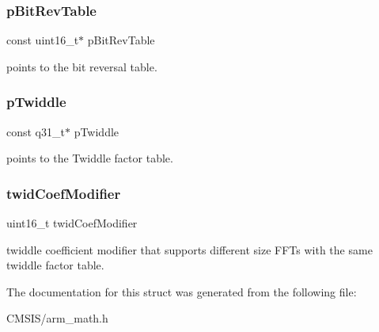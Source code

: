 \subsubsection{\texorpdfstring{pBitRevTable}{pBitRevTable}}
{\footnotesize\ttfamily const uint16\+\_\+t$\ast$ p\+Bit\+Rev\+Table}

points to the bit reversal table. \mbox{\label{structarm__cfft__radix2__instance__q31_a9760c603af5d85652496dbffd63a8a2e}} 
\subsubsection{\texorpdfstring{pTwiddle}{pTwiddle}}
{\footnotesize\ttfamily const q31\+\_\+t$\ast$ p\+Twiddle}

points to the Twiddle factor table. \mbox{\label{structarm__cfft__radix2__instance__q31_afe772e5b5001c9d8e85032115a8df5bf}} 
\subsubsection{\texorpdfstring{twidCoefModifier}{twidCoefModifier}}
{\footnotesize\ttfamily uint16\+\_\+t twid\+Coef\+Modifier}

twiddle coefficient modifier that supports different size F\+F\+Ts with the same twiddle factor table. 

The documentation for this struct was generated from the following file\+:\begin{DoxyCompactItemize}
\item 
C\+M\+S\+I\+S/arm\+\_\+math.\+h\end{DoxyCompactItemize}
